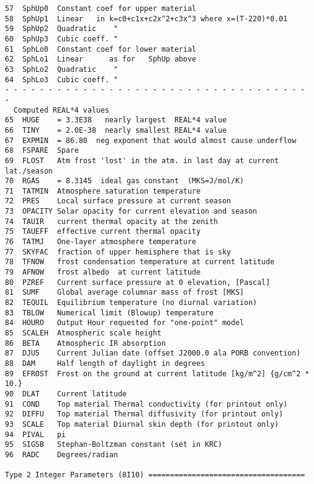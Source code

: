 \documentclass[draft]{article}  %
\begin{document}
\begin{verbatim}
57  SphUp0  Constant coef for upper material 
58  SphUp1  Linear   in k=c0+c1x+c2x^2+c3x^3 where x=(T-220)*0.01
59  SphUp2  Quadratic    " 
60  SphUp3  Cubic coeff. "
61  SphLo0  Constant coef for lower material 
62  SphLo1  Linear      as for   SphUp above
63  SphLo2  Quadratic    "
64  SphLo3  Cubic coeff. "
- - - - - - - - - - - - - - - - - - - - - - - - - - - - - - - - - - - -
  Computed REAL*4 values 
65  HUGE    = 3.3E38   nearly largest  REAL*4 value
66  TINY    = 2.0E-38  nearly smallest REAL*4 value
67  EXPMIN  = 86.80  neg exponent that would almost cause underflow
68  FSPARE  Spare
69  FLOST   Atm frost 'lost' in the atm. in last day at current lat./season
70  RGAS    = 8.3145  ideal gas constant  (MKS=J/mol/K)
71  TATMIN  Atmosphere saturation temperature
72  PRES    Local surface pressure at current season
73  OPACITY Solar opacity for current elevation and season
74  TAUIR   current thermal opacity at the zenith
75  TAUEFF  effective current thermal opacity 
76  TATMJ   One-layer atmosphere temperature
77  SKYFAC  fraction of upper hemisphere that is sky
78  TFNOW   frost condensation temperature at current latitude
79  AFNOW   frost albedo  at current latitude
80  PZREF   Current surface pressure at 0 elevation, [Pascal]
81  SUMF    Global average columnar mass of frost [MKS]
82  TEQUIL  Equilibrium temperature (no diurnal variation)
83  TBLOW   Numerical limit (Blowup) temperature
84  HOURO   Output Hour requested for "one-point" model
85  SCALEH  Atmospheric scale height
86  BETA    Atmospheric IR absorption
87  DJU5    Current Julian date (offset J2000.0 ala PORB convention)
88  DAM     Half length of daylight in degrees
89  EFROST  Frost on the ground at current latitude [kg/m^2] {g/cm^2 * 10.} 
90  DLAT    Current latitude
91  COND    Top material Thermal conductivity (for printout only)
92  DIFFU   Top material Thermal diffusivity (for printout only)
93  SCALE   Top material Diurnal skin depth (for printout only)
94  PIVAL   pi
95  SIGSB   Stephan-Boltzman constant (set in KRC)
96  RADC    Degrees/radian

Type 2 Integer Parameters (8I10) ====================================


\end{verbatim}
\end{document}
